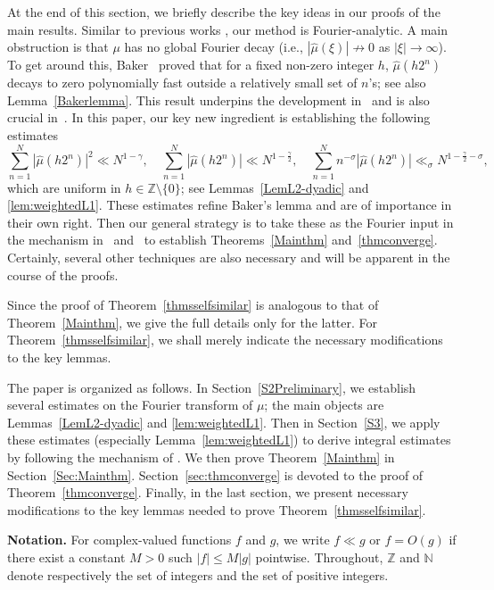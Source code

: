 \documentclass[amssymb,amsfonts,refcheck,12pt,verbatim,righttag]{amsart}
\numberwithin{equation}{section} %
\newcommand{\N}{\mathbb{N}}
\newcommand{\Z}{\mathbb{Z}}
\theoremstyle{plain}
\begin{document}
At the end of this section, we briefly describe the  key ideas  in our proofs of the main results. 
Similar to previous works \cite{ABCY23A,ACY24,Baker25A}, our method is Fourier-analytic. A main obstruction is that $\mu$ has no global Fourier decay (i.e., $|\widehat{\mu}(\xi)|\not\to 0$ as $|\xi|\to\infty$). To get around this, Baker~\cite[Lemma 2.2]{Baker25A} proved that for a fixed non-zero integer $h$, $\widehat{\mu}(h 2^n)$ decays to zero polynomially fast outside a relatively small set of $n$'s; see also   Lemma~\ref{Bakerlemma}. This result underpins the development in~\cite{Baker25A} and is also  crucial in~\cite{ABCY23A}. In this paper, our key new ingredient  is establishing the following estimates 
$$\sum_{n=1}^{N}|\widehat{\mu}(h2^n)|^2\ll N^{1-\gamma}, \quad  \sum_{n=1}^{N}|\widehat{\mu}(h2^n)|\ll N^{1-\frac{\gamma}{2}},\quad \sum_{n=1}^{N}n^{-\sigma}|\widehat{\mu}(h2^n)|\ll_{\sigma} N^{1-\frac{\gamma}{2}-\sigma},$$
which are uniform in $h\in \Z\setminus\{0\}$; see Lemmas~\ref{LemL2-dyadic} and \ref{lem:weightedL1}. These estimates refine Baker's lemma and  are of importance in their own right. Then our general strategy is to take these as the Fourier input in  the mechanism in~\cite{Baker25A} and~\cite{ABCY23A} to establish Theorems~\ref{Mainthm} and~\ref{thmconverge}. Certainly, several other techniques are  also necessary and will be apparent in the course of the proofs. 

Since the proof of Theorem~\ref{thmsselfsimilar} is analogous to that of Theorem~\ref{Mainthm}, we give the full details only for the latter. For Theorem~\ref{thmsselfsimilar}, we shall merely indicate the necessary modifications to the key lemmas.

The paper is organized as follows. In Section~\ref{S2Preliminary}, we establish several estimates on the Fourier transform of $\mu$; the main objects are Lemmas~\ref{LemL2-dyadic} and \ref{lem:weightedL1}. Then in Section~\ref{S3}, we apply these estimates (especially Lemma~\ref{lem:weightedL1}) to derive integral estimates by following the mechanism of  \cite{Baker25A}. We then prove Theorem~\ref{Mainthm} in Section~\ref{Sec:Mainthm}. Section~\ref{sec:thmconverge} is devoted to the proof of Theorem~\ref{thmconverge}. Finally, in the last section, we present necessary modifications to the key lemmas needed to prove Theorem~\ref{thmsselfsimilar}. 


{\bf Notation.} For complex-valued functions $f$ and $g$, we write $f\ll g$ or $f=O(g)$ if there exist a constant $M>0$ such $|f|\leq M|g|$ pointwise. Throughout, $\Z$ and $\N$ denote respectively the set of  integers and the set of positive integers. 
 
\end{document}
